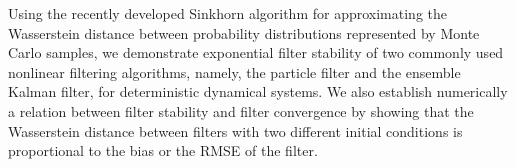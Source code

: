 

Using the recently developed Sinkhorn algorithm for approximating the Wasserstein distance between probability distributions represented by Monte Carlo samples, we demonstrate exponential filter stability of two commonly used nonlinear filtering algorithms, namely, the particle filter and the ensemble Kalman filter, for deterministic dynamical systems. We also establish numerically a relation between filter stability and filter convergence by showing that the Wasserstein distance between filters with two different initial conditions is proportional to the bias or the RMSE of the filter.


